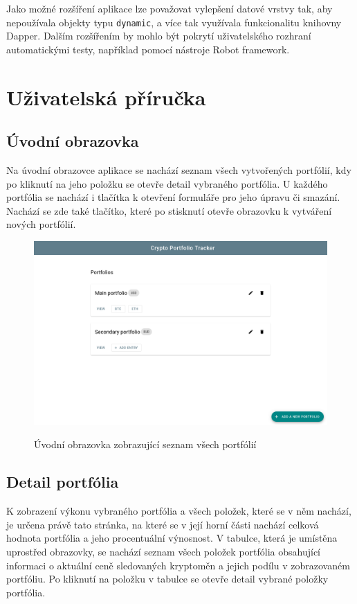 \documentclass[12pt, a4paper]{article}
\begin{document}
    Jako možné rozšíření aplikace lze považovat vylepšení datové vrstvy tak, aby nepoužívala objekty typu \texttt{dynamic},
    a více tak využívala funkcionalitu knihovny Dapper.
    Dalším rozšířením by mohlo být pokrytí uživatelského rozhraní automatickými testy, například pomocí nástroje Robot
    framework.
    
    \section{Uživatelská příručka}
    
    \subsection{Úvodní obrazovka}
    Na úvodní obrazovce aplikace se nachází seznam všech vytvořených portfólií, kdy po kliknutí na jeho položku se otevře detail vybraného portfólia.
    U každého portfólia se nachází i tlačítka k otevření formuláře pro jeho úpravu či smazání.
    Nachází se zde také tlačítko, které po stisknutí otevře obrazovku k vytváření nových portfólií.

    \begin{figure}[!ht]
        \centering
        {\includegraphics[width=\textwidth]{img/cpt-screenshots/portfolio-list.png}}
        \caption{Úvodní obrazovka zobrazující seznam všech portfólií}
        \label{fig:portfolio-list}
    \end{figure}

    \subsection{Detail portfólia}
    K zobrazení výkonu vybraného portfólia a všech položek, které se v něm nachází, je určena právě tato stránka,
    na které se v její horní části nachází celková hodnota portfólia a jeho procentuální výnosnost.
    V tabulce, která je umístěna uprostřed obrazovky, se nachází seznam všech položek portfólia obsahující informaci o
    aktuální ceně sledovaných kryptoměn a jejich podílu v zobrazovaném portfóliu.
    Po kliknutí na položku v tabulce se otevře detail vybrané položky portfólia.
\end{document}
